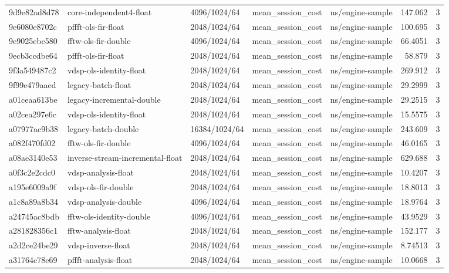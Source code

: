 \begin{longtable}{lllllrr}
9d9e82ad8d78 & core-independent4-float & 4096/1024/64 & mean\_session\_cost & ns/engine-sample & 147.062 & 3 \\
9e6080e8702c & pffft-ols-fir-float & 2048/1024/64 & mean\_session\_cost & ns/engine-sample & 100.695 & 3 \\
9e9025ebc580 & fftw-ols-fir-double & 4096/1024/64 & mean\_session\_cost & ns/engine-sample & 66.4051 & 3 \\
9ecb3ccdbe64 & pffft-ols-fir-float & 2048/1024/64 & mean\_session\_cost & ns/engine-sample & 58.879 & 3 \\
9f3a549487c2 & vdsp-ols-identity-float & 2048/1024/64 & mean\_session\_cost & ns/engine-sample & 269.912 & 3 \\
9f99e479aaed & legacy-batch-float & 2048/1024/64 & mean\_session\_cost & ns/engine-sample & 29.2999 & 3 \\
a01ceaa613be & legacy-incremental-double & 2048/1024/64 & mean\_session\_cost & ns/engine-sample & 29.2515 & 3 \\
a02cea297e6c & vdsp-ols-identity-float & 2048/1024/64 & mean\_session\_cost & ns/engine-sample & 15.5575 & 3 \\
a07977ac9b38 & legacy-batch-double & 16384/1024/64 & mean\_session\_cost & ns/engine-sample & 243.609 & 3 \\
a082f470fd02 & fftw-ols-fir-double & 4096/1024/64 & mean\_session\_cost & ns/engine-sample & 46.0165 & 3 \\
a08ae3140e53 & inverse-stream-incremental-float & 2048/1024/64 & mean\_session\_cost & ns/engine-sample & 629.688 & 3 \\
a0f3c2e2cdc0 & vdsp-analysis-float & 2048/1024/64 & mean\_session\_cost & ns/engine-sample & 10.4207 & 3 \\
a195e6009a9f & vdsp-ols-fir-double & 2048/1024/64 & mean\_session\_cost & ns/engine-sample & 18.8013 & 3 \\
a1c8a89a8b34 & vdsp-analysis-double & 4096/1024/64 & mean\_session\_cost & ns/engine-sample & 18.9764 & 3 \\
a24745ac8bdb & fftw-ols-identity-double & 4096/1024/64 & mean\_session\_cost & ns/engine-sample & 43.9529 & 3 \\
a281828356c1 & fftw-analysis-float & 2048/1024/64 & mean\_session\_cost & ns/engine-sample & 152.177 & 3 \\
a2d2ce24be29 & vdsp-inverse-float & 2048/1024/64 & mean\_session\_cost & ns/engine-sample & 8.74513 & 3 \\
a31764c78e69 & pffft-analysis-float & 2048/1024/64 & mean\_session\_cost & ns/engine-sample & 10.0668 & 3 \\

\end{longtable}
